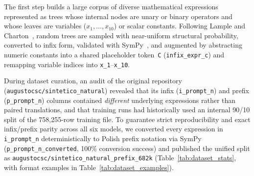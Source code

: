 The first step builds a large corpus of diverse mathematical expressions represented as trees whose internal nodes are unary or binary operators and whose leaves are variables ($x_1, \ldots, x_{10}$) or scalar constants. Following Lample and Charton~\cite{lample2019deep}, random trees are sampled with near-uniform structural probability, converted to infix form, validated with SymPy~\cite{sympy}, and augmented by abstracting numeric constants into a shared placeholder token~\texttt{C} (\texttt{infix\_expr\_c}) and remapping variable indices into \texttt{x\_1}--\texttt{x\_10}.

During dataset curation, an audit of the original repository (\texttt{augustocsc/sintetico\_natural}) revealed that its infix (\texttt{i\_prompt\_n}) and prefix (\texttt{p\_prompt\_n}) columns contained \emph{different} underlying expressions rather than paired translations, and that training runs had historically used an internal 90/10 split of the 758{,}255-row training file. To guarantee strict reproducibility and exact infix/prefix parity across all six models, we converted every expression in \texttt{i\_prompt\_n} deterministically to Polish prefix notation via SymPy (\texttt{p\_prompt\_n\_converted}, 100\% conversion success) and published the unified split as \texttt{augustocsc/sintetico\_natural\_prefix\_682k} (Table~\ref{tab:dataset_stats}, with format examples in Table~\ref{tab:dataset_examples}).

